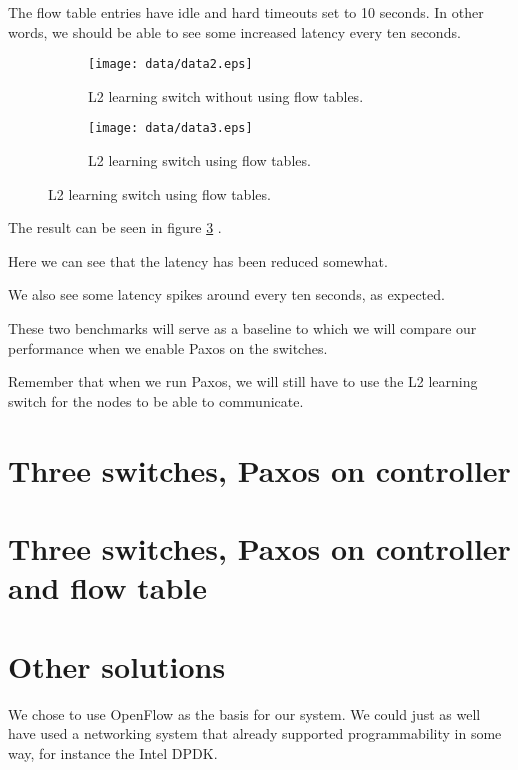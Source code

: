 The flow table entries have idle and hard timeouts set to 10 seconds.
In other words, we should be able to see some increased latency every ten
seconds.

\begin{figure}
  \centering
  \begin{subfigure}{\textwidth}
    \centering
    \texttt{[image: data/data2.eps]}
    \caption{L2 learning switch without using flow tables.}
    \label{benchmark:l2.learning.switch.no.flows}
  \end{subfigure}

  \centering
  \begin{subfigure}{\textwidth}
    \centering
    \texttt{[image: data/data3.eps]}
    \caption{L2 learning switch using flow tables.}
    \label{benchmark:l2.learning.switch.with.flows}
  \end{subfigure}
\end{figure}

The result can be seen in figure \ref{benchmark:l2.learning.switch.with.flows}
.

Here we can see that the latency has been reduced somewhat.

We also see some latency spikes around every ten seconds, as expected.


These two benchmarks will serve as a baseline to which we will compare our
performance when we enable Paxos on the switches.

Remember that when we run Paxos, we will still have to use the L2 learning
switch for the nodes to be able to communicate.


\section{Three switches, Paxos on controller}


\section{Three switches, Paxos on controller and flow table}


\section{Other solutions}

We chose to use OpenFlow as the basis for our system.
We could just as well have used a networking system that already supported
programmability in some way, for instance the Intel DPDK.

